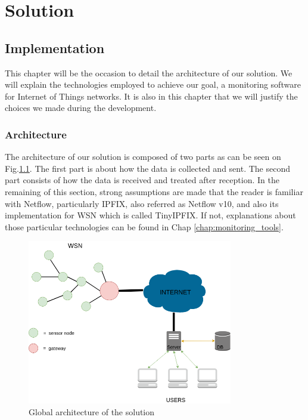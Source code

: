\part{Solution} \label{part:solution}

\chapter{Implementation}

This chapter will be the occasion to detail the architecture of our solution. We will explain the technologies employed to achieve our goal, a monitoring software for Internet of Things networks. It is also in this chapter that we will justify the choices we made during the development.

\section{Architecture}

The architecture of our solution is composed of two parts as can be seen on Fig.\ref{fig:design}. The first part is about how the data is collected and sent. The second part consists of how the data is received and treated after reception. In the remaining of this section, strong assumptions are made that the reader is familiar with Netflow, particularly IPFIX, also referred as Netflow v10, and also its implementation for WSN which is called TinyIPFIX. If not, explanations about those particular technologies can be found in Chap \ref{chap:monitoring_tools}. \\

\begin{figure}
	\centering
	\includegraphics[width=0.8\textwidth]{res/design.png}
	\caption{Global architecture of the solution}
	\label{fig:design}
\end{figure}

